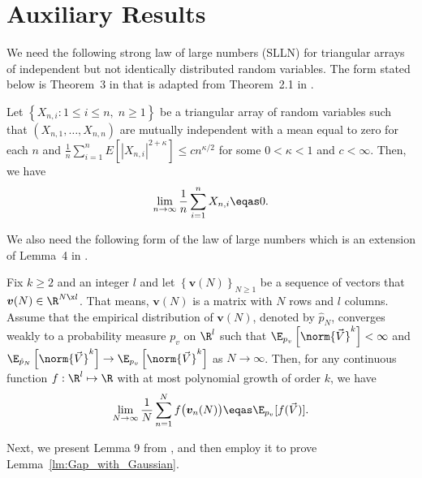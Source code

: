 \section{Auxiliary Results}
\label{apndx:auxiliary_results}
% 
We need the following strong law of large numbers (SLLN) for triangular arrays of independent but not identically distributed random variables. The form stated below is Theorem~3 in \cite{bayati2011dynamics} that is adapted from Theorem~2.1 in \cite{hu1997strong}.
\begin{theorem}[SLLN]
    \label{thm:SLLN}
    Let $\left\{X_{n,i}:1\leq i \leq n,\; n \geq 1\right\}$ be a triangular array of random variables such that $(X_{n,1},\ldots,X_{n,n})$ are mutually independent with a mean equal to zero for each $n$ and $\frac{1}{n} \sum_{i=1}^n E\left[|X_{n,i}|^{2+\kappa}\right] \leq c n^{\kappa/2}$ for some $0 < \kappa < 1$ and $c < \infty$. Then, we have
    \begin{align}
        \label{eq:SLLN}
        \lim_{n \rightarrow \infty}
        \frac{1}{n} \sum_{i=1}^n X_{n,i} \eqas 0.
    \end{align}
\end{theorem}
We also need the following form of the law of large numbers which is an extension of Lemma~4 in \cite{bayati2011dynamics}.
\begin{theorem}
    \label{thm:SLLN-2}
    Fix $k\geq 2$ and an integer $l$ and let $\left\{\bm v(N)\right\}_{N \geq 1}$ be a sequence of vectors that $\bm v(N) \in \R^{N\x l}$. That means, $\bm v(N)$ is a matrix with $N$ rows and $l$ columns. Assume that the empirical distribution of $\bm v(N)$, denoted by $\hat{p}_{N}$, converges weakly to a probability measure $p_v$ on $\R^l$ such that $\E_{p_v}\left[\norm{\Vec{V}}^k\right] < \infty$ and $\E_{\hat{p}_{N}}\left[\norm{\Vec{V}}^k\right] \rightarrow \E_{p_v}\left[\norm{\Vec{V}}^k\right]$ as $N \rightarrow \infty$. Then, for any continuous function $f:\R^l \mapsto \R$ with at most polynomial growth of order $k$, we have
    \begin{align}
        \label{eq:SLLN-2}
        \lim_{N \rightarrow \infty}
        \frac{1}{N} \sum_{n=1}^N f\big(\bm v_n(N)\big)
        \eqas \E_{p_v} [f(\Vec{V})].
    \end{align}
\end{theorem}
% 
Next, we present Lemma 9 from \cite{li2022non}, and then employ it to prove Lemma~\ref{lm:Gap_with_Gaussian}.
% 
